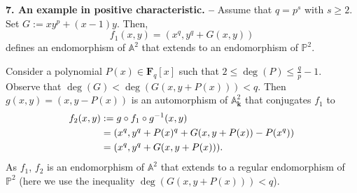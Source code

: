 \documentclass[reqno,oneside,12pt]{amsart}
\theoremstyle{plain}
\theoremstyle{definition}
\newtheorem{eg}[thm]{Example}
\def\bfk{{\mathbf{k}}}
\def\bfF{{\mathbf{F}}}
\newcommand{\bbA}{{\mathbb{A}}}
\def\P{\mathbb{P}}
\begin{document}
{{{{%
%



{\noindent}{\bf{7. An example in positive characteristic. --}}  Assume that $q=p^s$ with $s\geq 2$.
Set $G:=xy^p+(x-1)y$. Then, 
$$f_1(x,y)=(x^q, y^q+G(x,y))$$
defines an endomorphism of $\bbA^2$ that extends to an endomorphism of $\P^2$.

Consider a polynomial $P(x)\in\bfF_q[x]$ such that  $2 \leq \deg(P) \leq \frac{q}{p}-1$.
Observe that $\deg (G) < \deg (G(x,y+P(x))) < q$.
Then $g(x,y)= (x,y-P(x))$
is an automorphism of $\bbA^2_\bfk$ that conjugates $f_1$ to 
\begin{align}f_2(x,y) &:=g\circ f_1\circ g^{-1}(x,y) \notag \\
&=(x^q,y^q+P(x)^q+G(x,y+P(x))-P(x^q))\\
&=(x^q,y^q+G(x,y+P(x))).\notag
\end{align}
As $f_1$, $f_2$ is an endomorphism of $\bbA^2$ that extends to a regular endomorphism of~$\P^2$
(here we use the inequality $\deg (G(x,y+P(x))) < q$).

}}}}
\end{document}
